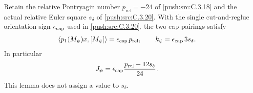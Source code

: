 \begin{lemma}\label{push:src:C.3.22}
Retain the relative Pontryagin number
$p_{\mathrm{rel}}=-24$ of \ref{push:src:C.3.18} and the actual relative
Euler square $s_\delta$ of \ref{push:src:C.3.20}. With the single
cut-and-reglue orientation sign $\epsilon_{\rm cap}$ used
in \ref{push:src:C.3.20}, the two cap pairings satisfy
\[
 \langle p_1(M_\psi)x,[M_\psi]\rangle
       =\epsilon_{\rm cap}\,p_{\mathrm{rel}},
 \qquad
 k_\psi=\epsilon_{\rm cap}\,3s_\delta.
\]
In particular
\[
 J_\psi=\epsilon_{\rm cap}
              \frac{p_{\mathrm{rel}}-12s_\delta}{24}.
\]
This lemma does not assign a value to $s_\delta$.
\end{lemma}

